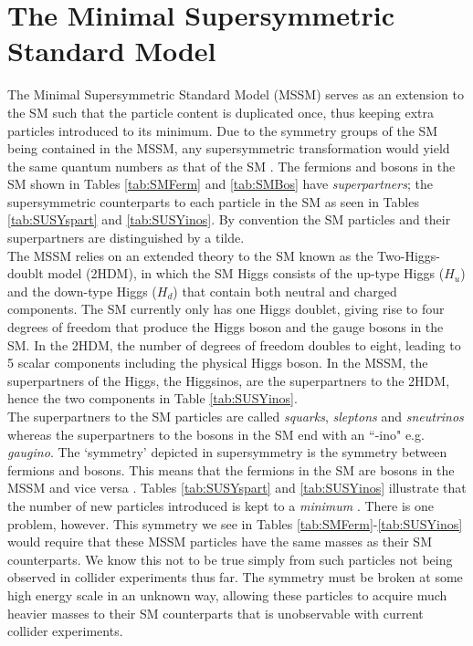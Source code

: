 \section{The Minimal Supersymmetric Standard Model}
The Minimal Supersymmetric Standard Model (MSSM) serves as an extension to the SM such that the particle content is duplicated once, thus keeping extra particles introduced to its minimum. Due to the symmetry groups of the SM being contained in the MSSM, any supersymmetric transformation would yield the same quantum numbers as that of the SM \cite{aitchison2007supersymmetry}. The fermions and bosons in the SM shown in Tables \ref{tab:SMFerm} and \ref{tab:SMBos}  have \textit{superpartners}; the supersymmetric counterparts to each particle in the SM as seen in Tables \ref{tab:SUSYspart} and \ref{tab:SUSYinos}. By convention the SM particles and their superpartners are distinguished by a tilde. \\

The MSSM relies on an extended theory to the SM known as the Two-Higgs-doublt model (2HDM), in which the SM Higgs consists of the up-type Higgs ($H_u$) and the down-type Higgs ($H_d$) that contain both neutral and charged components. The SM currently only has one Higgs doublet, giving rise to four degrees of freedom that produce the Higgs boson and the gauge bosons in the SM. In the 2HDM, the number of degrees of freedom doubles to eight, leading to 5 scalar components including the physical Higgs boson. In the MSSM, the superpartners of the Higgs, the Higgsinos, are the superpartners to the 2HDM, hence the two components in Table \ref{tab:SUSYinos}. \\

The superpartners to the SM particles are called \textit{squarks}, \textit{sleptons} and \textit{sneutrinos} whereas the superpartners to the bosons in the SM end with an ``-ino" e.g. \textit{gaugino}. The `symmetry' depicted in supersymmetry is the symmetry between fermions and bosons. This means that the fermions in the SM are bosons in the MSSM and vice versa \cite{martin1997supersymmetry}. Tables \ref{tab:SUSYspart} and \ref{tab:SUSYinos} illustrate that the number of new particles introduced is kept to a \textit{minimum} \cite{aitchison2007supersymmetry}. There is one problem, however. This symmetry we see in Tables \ref{tab:SMFerm}-\ref{tab:SUSYinos} would require that these MSSM particles have the same masses as their SM counterparts. We know this not to be true simply from such particles not being observed in collider experiments thus far. The symmetry must be broken at some high energy scale in an unknown way, allowing these particles to acquire much heavier masses to their SM counterparts that is unobservable with current collider experiments. \\

